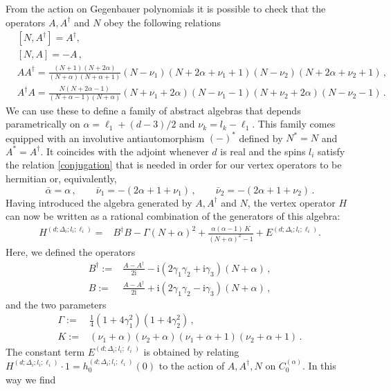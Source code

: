 \documentclass{article}
\def \Dg {\Delta}
\def \ag {\alpha}
\def \cg {\gamma}
\begin{document}
From the action on Gegenbauer polynomials it is possible to check that the 
operators $A,A^{\dagger}$ and $N$ obey the following relations  
\begin{align}
    &[N,A^{\dagger}] = A^{\dagger}, \label{NA*}\\
    &[N,A]=-A\,, \label{NA} \\
& A A^{\dagger} = \frac{(N+1)(N+2\ag)}{(N+\ag)(N+\ag+1)} (N-\nu_1)(N+2\ag+\nu_1+1)(N-\nu_2)(N+2\ag+\nu_2+1)\,, \label{AA*_alpha}\\ 
        & A^{\dagger} A = \frac{N(N+2\ag-1)}{(N+\ag-1)(N+\ag)} (N+\nu_1+2\ag)(N-\nu_1-1)(N+\nu_2+2\ag)(N-\nu_2-1)\,. \label{A*A_alpha}
\end{align}
We can use these to define a family of abstract algebras that depends 
parametrically on $\ag = \ell_1 +(d-3)/2$ and $\nu_k = l_k - \ell_1$. This 
family comes equipped with an involutive antiautomorphism $(-)^\ast$ defined by 
$N^\ast = N$ and $A^\ast = A^\dagger$. It coincides with the adjoint whenever 
$d$ is real and the spins $l_i$ satisfy the relation \eqref{conjugation} that 
is needed in order for our vertex operators to be hermitian or, equivalently, 
\begin{equation}
    \bar{\ag} = \ag\,, \qquad \bar{\nu}_1 = -(2 \ag+1+\nu_1)\,, \qquad \bar{\nu}_2 = -(2 \ag+1+\nu_2)\,.
\end{equation}
Having introduced the algebra generated by $A, A^\dagger$ and $N$, the vertex operator $H$ can now be written as a rational combination of the generators of this algebra:
\begin{align}
H^{(d;\Dg_i;l_i;\ell_i)} =& B^{\dagger} B - \Gamma  (N+\ag)^2+ \frac{\ag(\ag-1)\, K}{(N+\ag)^2-1} + E^{(d;\Dg_i;l_i;\ell_i)}.
\label{HamFac}
\end{align}
Here, we defined the operators
\begin{align}
B^{\dagger} :=& \frac{A-A^{\dagger}}{2\mathrm{i} } - \mathrm{i} (2\cg_1\cg_2 +\mathrm{i} \cg_3)(N+\ag)\,,  \\
B :=& \frac{A-A^{\dagger}}{2\mathrm{i} } + \mathrm{i} (2\cg_1\cg_2 -\mathrm{i} \cg_3)(N+\ag)\,,
\end{align}
and the two parameters
\begin{align}
\Gamma :=& \frac{1}{4} (1+4\cg_1^2)(1+4\cg_2^2)\,, \\
K :=&  (\nu_1+\ag)(\nu_2+\ag)(\nu_1+\ag+1)(\nu_2+\ag+1)\,.
\end{align}
The constant term $E^{(d;\Dg_i;l_i;\ell_i)}$ is obtained by relating $H^{(d;\Dg_i;l_i;\ell_i)} \cdot 1 = h_0^{(d;\Dg_i;l_i;\ell_i)}(0)$ to the action of $A,A^{\dagger},N$ on $C_0^{(\ag)}$. In this way we find
\end{document}

